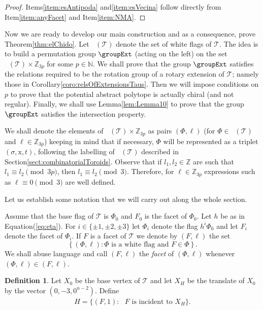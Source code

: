 \documentclass[final]{amsart}
\theoremstyle{plain}
\theoremstyle{definition}
\newtheorem{defn}[thm]{Definition}
\theoremstyle{remark}
\numberwithin{equation}{section}
\renewcommand{\{}{\lbrace}
\renewcommand{\}}{\rbrace}
\newcommand{\bN}{\mathbb{N}}
\newcommand{\bZ}{\mathbb{Z}}
\newcommand{\cT}{\mathcal{T}}
\newcommand{\cyvec}[1]{{\mathrm{#1}}}
\newcommand{\vx}{\cyvec{x}}
\DeclareMathOperator{\Fw}{\mathcal{F}^{w}}
\newcommand{\kng}{{h}}
\begin{document}
\begin{proof}
    Items\nobreakspace \ref {item:esAntipoda} and\nobreakspace  \ref {item:esVecina} follow directly from Item\nobreakspace \ref {item:anyFacet} and Item\nobreakspace \ref {item:NMA}.
\end{proof}










Now we are ready to develop our main construction and as a consequence, prove Theorem\nobreakspace \ref {thm:elChido}.
Let $\Fw(\cT)$ denote the set of white flags of $\cT$.
The idea is to build a permutation group $\groupExt$ (acting on the left) on the set $\Fw(\cT) \times \bZ_{3 p}$ for some $p \in \bN$.
We shall prove that the group $\groupExt$ satisfies the relations required to be the rotation group of a rotary extension of $\cT$;
namely those in Corollary\nobreakspace \ref {coro:relsOfExtensionsTaus}.
Then we will impose conditions on $p$ to prove that the potential abstract polytope is actually chiral (and not regular).
Finally, we shall use Lemma\nobreakspace \ref {lem:Lemma10} to prove that the group $\groupExt$ satisfies the intersection property.

We shall denote the elements of $\Fw(\cT) \times \bZ_{3p}$  as pairs $(\Phi,\ell)$ (for $\Phi \in \Fw(\cT)$ and $\ell \in \bZ_{3p}$) keeping in mind that if necessary, $\Phi$ will be represented as a triplet $(\sigma, \vx, t)$, following the labelling of $\Fw(\cT)$ described in Section\nobreakspace \ref {sect:combinatorialToroids}.
Observe that if $l_{1}, l_{2} \in \bZ$ are such that $l_{1}\equiv l_{2} \pmod{3p}$, then $l_{1} \equiv l_{2} \pmod{3}$. Therefore, for $\ell \in \bZ_{3p}$ expressions such as $\ell \equiv 0 \pmod{3}$ are well defined.

Let us establish some notation that we will carry out along the whole section.

Assume that the base flag of $\cT$ is $\Phi_{0}$ and $F_{0}$ is the facet of $\Phi_{0}$.
Let $\kng$ be as in Equation\nobreakspace \textup {(\ref {eq:eta})}.
For $i \in \{\pm 1, \pm 2, \pm 3\}$ let $\Phi_i$ denote the flag $\kng^{i}\Phi_{0}$ and let $F_{i} $ denote the facet of $\Phi_i$.
If $F$ is a facet of $\cT$ we denote by $(F,\ell)$ the set \[\left\{ (\Phi,\ell) : \Phi \text{ is a white flag  and }F \in \Phi \right\}.   \] 
We shall abuse language and call $(F,\ell)$ the \emph{facet} of $(\Phi,\ell)$ whenever $(\Phi,\ell) \in (F,\ell)$.

\begin{defn}\label{defn:hoyo}
Let $X_0$ be the base vertex of $\cT$ and let $X_H$ be the translate of $X_0$ by the vector $(0,-3,0^{n-2})$. Define 
\begin{align*}
H = \{(F,1) : \text{ $F$ is incident to $X_H$} \}.
\end{align*}
\end{defn}
\end{document}
